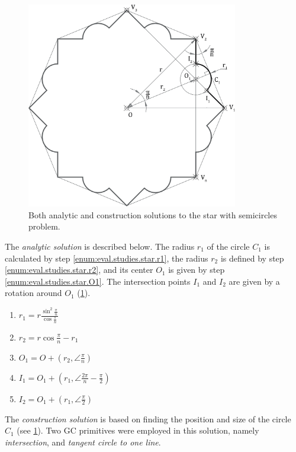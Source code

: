 \begin{figure}[htb]
  \centering
  \includegraphics[height=9cm]{fig/star-solution}
  \caption[Star with semicircles problem solution]{ Both analytic and
    construction solutions to the star with semicircles problem.}%
  \label{fig:eval.studies.star.sol}
\end{figure}

The \textit{analytic solution} is described below.  The radius $r_1$ of the
circle $C_1$ is calculated by step \ref{enum:eval.studies.star.r1}, the radius
$r_2$ is defined by step \ref{enum:eval.studies.star.r2}, and its center $O_1$
is given by step \ref{enum:eval.studies.star.O1}.  The intersection points $I_1$
and $I_2$ are given by a rotation around $O_1$
(\cref{fig:eval.studies.star.sol}).

\begin{enumerate}
  \item $r_1 = r\frac{\sin^2\frac{\pi}{n}}{\cos\frac{\pi}{n}}$%
  \label{enum:eval.studies.star.r1}
  \item $r_2 = r\cos\frac{\pi}{n} - r_1$%
  \label{enum:eval.studies.star.r2}
  \item $O_1 = O + \left(r_2, \angle\frac{\pi}{n}\right)$%
  \label{enum:eval.studies.star.O1}
  \item $I_1 = O_1 + \left(r_1, \angle\frac{2\pi}{n} - \frac{\pi}{2}\right)$
  \item $I_2 = O_1 + \left(r_1, \angle\frac{\pi}{2}\right)$
\end{enumerate}

The \textit{construction solution} is based on finding the position and size of
the circle $C_1$ (see \cref{fig:eval.studies.star.sol}).  Two \ac{GC}
primitives were employed in this solution, namely \textit{intersection}, and
\textit{tangent circle to one line}.


